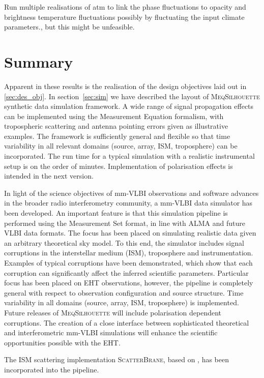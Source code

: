 Run multiple realisations of atm to link the phase fluctuations to opacity and brightness temperature fluctuations possibly by fluctuating the input climate parameters., but this might be unfeasible.


\section{Summary}

Apparent in these results is the realisation of the design objectives laid out in \ref{sec:des_obj}.
In section~\ref{sec:sim} we have described the layout of \textsc{MeqSilhouette} synthetic data simulation framework. A wide range of signal propagation effects can be implemented using the Measurement Equation formalism, with tropospheric scattering and antenna pointing errors given as illustrative examples. The framework is sufficiently general and flexible so that time variability in all relevant domains (source, array, ISM, troposphere) can be incorporated. The run time for a typical simulation with a realistic instrumental setup is on the order of minutes.  Implementation of polarisation effects is intended in the next version. 

In light of the science objectives of mm-VLBI observations and software advances in the broader radio interferometry community, a mm-VLBI data simulator has been developed. An important feature is that this simulation pipeline is performed using the {\sc Measurement Set} format, in line with ALMA and future VLBI data formats. The focus has been placed on simulating realistic data given an arbitrary theoretical sky model. To this end, the simulator includes signal corruptions in the interstellar medium (ISM), troposphere and instrumentation. Examples of typical corruptions have been demonstrated, which show that each corruption can significantly affect the inferred scientific parameters. Particular focus has been placed on EHT observations, however, the pipeline is completely general with respect to observation configuration and source structure. Time variability in all domains (source, array, ISM, troposphere) is implemented.  Future releases of \textsc{MeqSilhouette} will include polarisation dependent corruptions. The creation of a close interface between sophisticated theoretical and interferometric mm-VLBI simulations will enhance the scientific opportunities possible with the EHT.

The ISM scattering implementation \textsc{ScatterBrane}, based on \citet*{Johnson_2015a}, has been incorporated into the pipeline.


